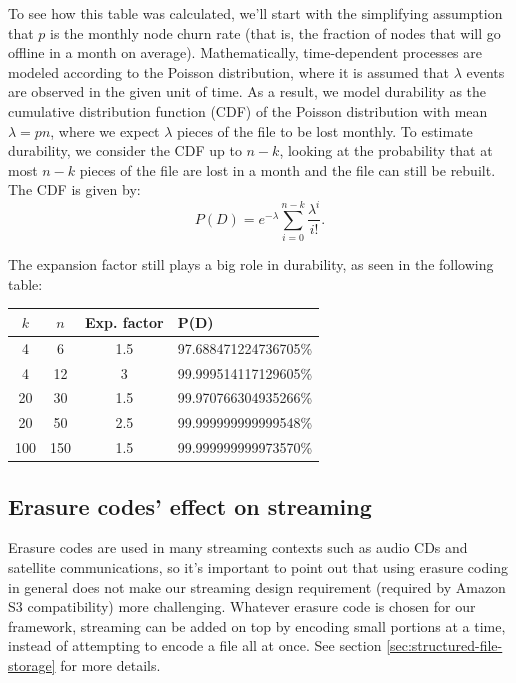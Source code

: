 \documentclass[11pt,fleqn,openany]{book}
\begin{document}
To see how this table was calculated, we'll start
with the simplifying assumption that $p$ is the monthly node
churn rate (that is, the fraction of nodes that will go offline in a month on
average). Mathematically, time-dependent processes are modeled according to
the Poisson distribution, where it is assumed that $\lambda$ events are
observed in the given unit of time.
As a result, we model durability
as the cumulative distribution function (CDF) of the Poisson distribution with mean $\lambda=pn$,
where we expect $\lambda$ pieces of the file to be lost monthly.
To estimate
durability, we consider the CDF up to $n-k$,
looking at the probability that at most $n-k$ pieces
of the file are lost in a month and the file can still be rebuilt.
The CDF is given by:
\begin{equation}
P(D) = e^{-\lambda} \sum_{i=0}^{n-k} \frac{\lambda^i}{i!}.
\label{eq:poiss_cdf}
\end{equation}

The expansion factor still plays a big role in durability, as seen in the
following table:

\begin{center}
\begin{tabular}{c c c l}
$k$ & $n$ & Exp. factor & P(D) \\ \hline
4 & 6 & 1.5 & 97.688471224736705\%\\
4 & 12 & 3 & 99.999514117129605\%\\
20 & 30 & 1.5 & 99.970766304935266\%\\
20 & 50 & 2.5 & 99.999999999999548\%\\
100 & 150 & 1.5 & 99.999999999973570\%\\
\end{tabular}
\end{center}

\subsection{Erasure codes' effect on streaming}

Erasure codes are used in many streaming contexts such as audio CDs and
satellite communications, so it's important to point out that using erasure
coding in general does not make our streaming design requirement
(required by Amazon S3 compatibility) more challenging.
Whatever erasure code is chosen for our framework, streaming can be
added on top by encoding small portions at a time, instead of attempting to
encode a file all at once. See section \ref{sec:structured-file-storage} for
more details.
\end{document}
